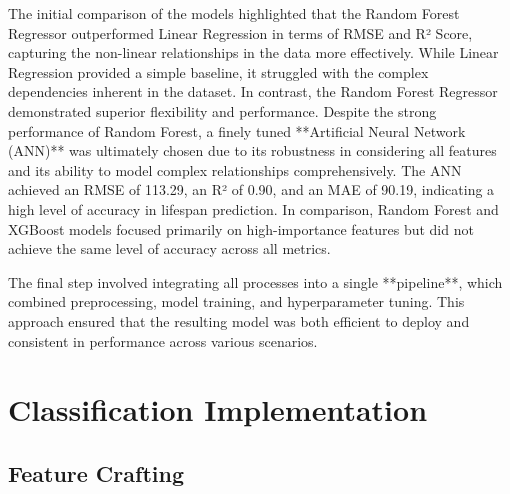 \documentclass{article}
\begin{document}
The initial comparison of the models highlighted that the Random Forest Regressor outperformed Linear Regression in terms of RMSE and R² Score, capturing the non-linear relationships in the data more effectively. While Linear Regression provided a simple baseline, it struggled with the complex dependencies inherent in the dataset. In contrast, the Random Forest Regressor demonstrated superior flexibility and performance.
Despite the strong performance of Random Forest, a finely tuned **Artificial Neural Network (ANN)** was ultimately chosen due to its robustness in considering all features and its ability to model complex relationships comprehensively. The ANN achieved an RMSE of 113.29, an R² of 0.90, and an MAE of 90.19, indicating a high level of accuracy in lifespan prediction. In comparison, Random Forest and XGBoost models focused primarily on high-importance features but did not achieve the same level of accuracy across all metrics.

The final step involved integrating all processes into a single **pipeline**, which combined preprocessing, model training, and hyperparameter tuning. This approach ensured that the resulting model was both efficient to deploy and consistent in performance across various scenarios.
\section{Classification Implementation}
\subsection{Feature Crafting}

\end{document}
